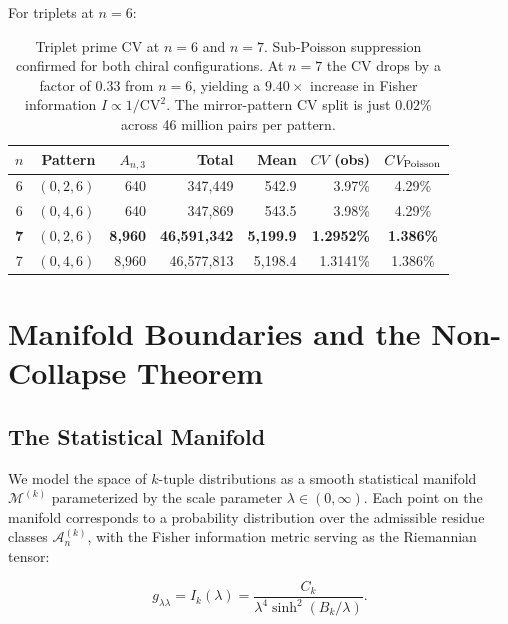 \documentclass[11pt]{article}
\theoremstyle{remark}
\begin{document}
For triplets at $n=6$:
\begin{table}[h]
\centering
\begin{tabular}{c r r r r r c}
\toprule
$n$ & Pattern & $A_{n,3}$ & Total & Mean & $CV$ (obs) & $CV_{\rm Poisson}$ \\
\midrule
6 & $(0,2,6)$ & 640 & 347{,}449 & 542.9 & 3.97\% & 4.29\% \\
6 & $(0,4,6)$ & 640 & 347{,}869 & 543.5 & 3.98\% & 4.29\% \\
\textbf{7} & \textbf{$(0,2,6)$} & \textbf{8{,}960} & \textbf{46{,}591{,}342} & \textbf{5{,}199.9} & \textbf{1.2952\%} & \textbf{1.386\%} \\
7 & $(0,4,6)$ & 8{,}960 & 46{,}577{,}813 & 5{,}198.4 & 1.3141\% & 1.386\% \\
\bottomrule
\end{tabular}
\caption{Triplet prime CV at $n=6$ and $n=7$. Sub-Poisson suppression
confirmed for both chiral configurations. At $n=7$ the CV drops by a
factor of $0.33$ from $n=6$, yielding a $9.40\times$ increase in
Fisher information $I \propto 1/\text{CV}^2$. The mirror-pattern
CV split is just $0.02\%$ across 46 million pairs per pattern.}
\end{table}

\section{Manifold Boundaries and the Non-Collapse Theorem}
\label{sec:non-collapse}

\subsection{The Statistical Manifold}

We model the space of $k$-tuple distributions as a smooth statistical
manifold $\mathcal{M}^{(k)}$ parameterized by the scale parameter
$\lambda \in (0, \infty)$. Each point on the manifold corresponds to a
probability distribution over the admissible residue classes
$\mathcal{A}_n^{(k)}$, with the Fisher information metric serving as
the Riemannian tensor:

\begin{equation}
g_{\lambda\lambda} = I_k(\lambda) = \frac{C_k}{\lambda^4 \sinh^2(B_k/\lambda)}.
\end{equation}
\end{document}
